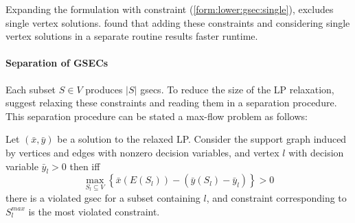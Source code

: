  Expanding the formulation with constraint (\ref{form:lower:gsec:single}), excludes single vertex solutions.
 \citet{lucena2004strong} found that adding these constraints and
 considering single vertex solutions in a separate routine results faster runtime.

 \paragraph{Separation of GSECs} Each subset $S \in V$ produces $|S|$ \glspl{gsec}. To reduce the size of the LP relaxation,
 \citet{lucena2004strong} suggest relaxing these constraints and reading them in a separation procedure.
 This separation procedure can be stated a max-flow problem as follows:

 Let $(\bar{x}, \bar{y})$ be a solution to the relaxed LP. Consider the support graph induced by vertices and edges with nonzero decision variables,
  and vertex $l$ with decision variable $\bar y_l > 0$
  then iff
  \[\max_{S_l \subseteq V} \left\{ \bar x (E(S_l)) - (\bar y (S_l) - \bar y_l) \right\} > 0\]
  there is a violated \gls{gsec} for a subset containing $l$, and constraint corresponding to $S_l^{max}$ is the most violated constraint.

